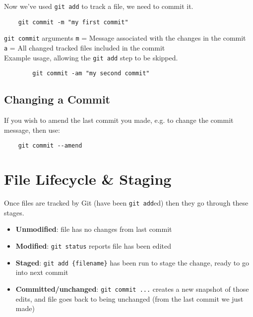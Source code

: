 Now we've used \texttt{git add} to track a file, we need to commit it.

\begin{verbatim}
    git commit -m "my first commit"
\end{verbatim}

\begin{infobox}{\texttt{git commit} arguments}
    \texttt{m} = Message associated with the changes in the commit
    \\
    \texttt{a} = All changed tracked files included in the commit
    \\

    Example usage, allowing the \texttt{git add} step to be skipped.

    \begin{verbatim}
        git commit -am "my second commit"
    \end{verbatim}
\end{infobox}

\subsection{Changing a Commit}

If you wish to amend the last commit you made, e.g. to change the commit message, then use:

\begin{verbatim}
    git commit --amend
\end{verbatim}

\section{File Lifecycle \& Staging}

Once files are tracked by Git (have been \texttt{git add}ed) then they go through these stages.

\begin{itemize}
    \item \textbf{Unmodified}: file has no changes from last commit
    \item \textbf{Modified}: \texttt{git status} reports file has been edited
    \item \textbf{Staged}: \texttt{git add \{filename\}} has been run to stage the change, ready to go into next commit
    \item \textbf{Committed/unchanged}: \texttt{git commit ...} creates a new snapshot of those edits, and file goes back to being unchanged (from the last commit we just made)
\end{itemize}

